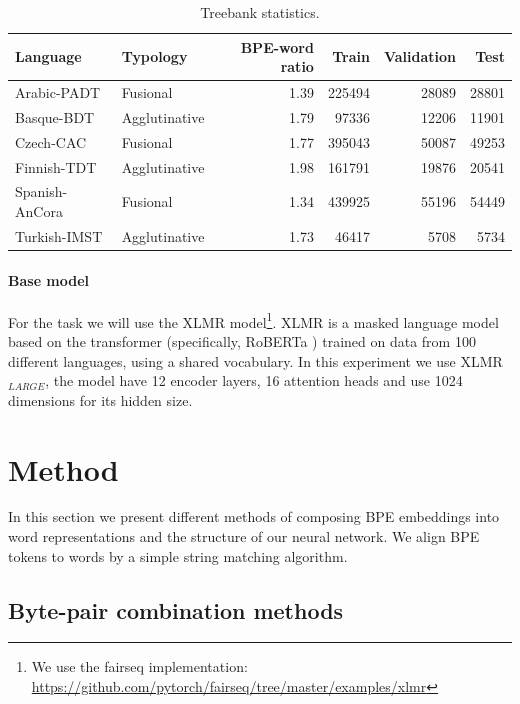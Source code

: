 \documentclass[11pt]{article}
\begin{document}
    	\begin{table}[h]
		\centering
		\begin{tabular}{l|lrrrr}
			Language & Typology & BPE-word ratio & Train & Validation & Test \\
			\hline
			Arabic-PADT  & Fusional & 1.39 & 225494 & 28089 & 28801  \\
			Basque-BDT  & Agglutinative & 1.79 & 97336 & 12206 & 11901 \\
			Czech-CAC   & Fusional & 1.77 & 395043 & 50087 & 49253 \\
			Finnish-TDT & Agglutinative & 1.98 & 161791 & 19876 & 20541 \\
			Spanish-AnCora & Fusional & 1.34 & 439925 & 55196 & 54449 \\
			Turkish-IMST & Agglutinative & 1.73 & 46417 & 5708 & 5734 \\
		\end{tabular}
		\caption{\label{tab:data} Treebank statistics.}
	\end{table}
    
    \paragraph{Base model}
    
	For the task we will use the XLMR \citep{conneau2019unsupervised} model\footnote{We use the fairseq implementation: \url{https://github.com/pytorch/fairseq/tree/master/examples/xlmr}}. XLMR is a masked language model based on the transformer (specifically, RoBERTa \citep{liu2019roberta}) trained on data from 100 different languages, using a shared vocabulary. In this experiment we use \textsc{XLMR}$_{LARGE}$, the model have 12 encoder layers, 16 attention heads and use 1024 dimensions for its hidden size.
	
	\section{Method}
	\label{method}
	
	In this section we present different methods of composing BPE embeddings into word representations and the structure of our neural network. We align BPE tokens to words by a simple string matching algorithm. 
	
	\subsection{Byte-pair combination methods}
	
\end{document}
